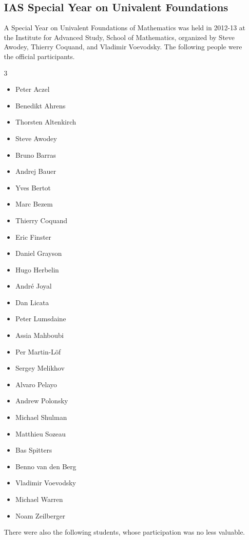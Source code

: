 \documentclass[12pt]{article}
\def\OPTprefacecols{3}
\begin{document}
\subsection*{IAS Special Year on Univalent Foundations}

A Special Year on Univalent Foundations of Mathematics was held in 2012-13 at the Institute for Advanced Study, School of Mathematics, organized by Steve Awodey, Thierry Coquand, and Vladimir Voevodsky. The following people were the official participants.

\begin{multicols}{\OPTprefacecols}{
\begin{itemize}
\item[] Peter Aczel
\item[] Benedikt Ahrens
\item[] Thorsten Altenkirch
\item[] Steve Awodey
\item[] Bruno Barras
\item[] Andrej Bauer
\item[] Yves Bertot
\item[] Marc Bezem
\item[] Thierry Coquand
\item[] Eric Finster
\item[] Daniel Grayson
\item[] Hugo Herbelin
\item[] Andr\'e Joyal
\item[] Dan Licata
\item[] Peter Lumsdaine
\item[] Assia Mahboubi
\item[] Per Martin-L\"of
\item[] Sergey Melikhov
\item[] Alvaro Pelayo
\item[] Andrew Polonsky
\item[] Michael Shulman
\item[] Matthieu Sozeau
\item[] Bas Spitters
\item[] Benno van den Berg
\item[] Vladimir Voevodsky
\item[] Michael Warren
\item[] Noam Zeilberger
\end{itemize}
}
\end{multicols}

\noindent There were also the following students, whose participation was no less valuable.
\end{document}
